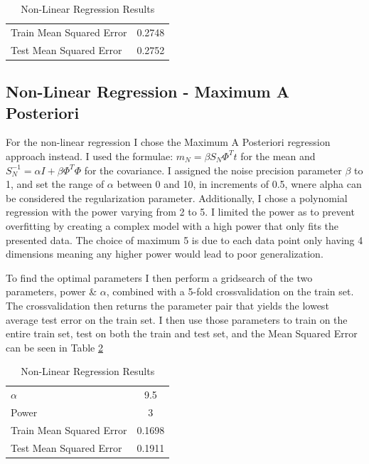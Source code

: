 \documentclass{article}
\theoremstyle{plain}
\theoremstyle{nonumberplain}
\begin{document}
\begin{table}[htb]
\centering
\caption{Non-Linear Regression Results}
\label{table:linear}
\begin{tabular}{l|c}
	\hline \hline
	Train Mean Squared Error & 0.2748 \\
	Test Mean Squared Error & 0.2752 \\
\end{tabular}
\end{table}

\subsection{Non-Linear Regression - Maximum A Posteriori}

For the non-linear regression I chose the Maximum A Posteriori regression approach instead.
I used the formulae:
$m_N = \beta S_N\Phi^T t$ for the mean and $S^{-1}_N = \alpha I + \beta \Phi^T\Phi$ for the covariance.
I assigned the noise precision parameter $\beta$ to 1, and set the range of $\alpha$ between 0 and 10, in increments of 0.5, wnere alpha can be considered the regularization parameter.
Additionally, I chose a polynomial regression with the power varying from 2 to 5. 
I limited the power as to prevent overfitting by creating a complex model with a high power that only fits the presented data.
The choice of maximum 5 is due to each data point only having 4 dimensions meaning any higher power would lead to poor generalization.

To find the optimal parameters I then perform a gridsearch of the two parameters, power \& $\alpha$, combined with a 5-fold crossvalidation on the train set.
The crossvalidation then returns the parameter pair that yields the lowest average test error on the train set. 
I then use those parameters to train on the entire train set, test on both the train and test set, and the Mean Squared Error can be seen in Table \ref{table:non-linear}

\begin{table}[htb]
\centering
\caption{Non-Linear Regression Results}
\label{table:non-linear}
\begin{tabular}{l|c}
	\hline \hline
	$\alpha$ & 9.5 \\
	Power & 3 \\
	Train Mean Squared Error & 0.1698 \\
	Test Mean Squared Error & 0.1911 \\
\end{tabular}
\end{table}
\end{document}
